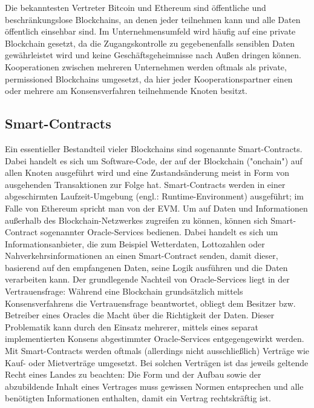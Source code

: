 Die bekanntesten Vertreter Bitcoin und Ethereum sind öffentliche und beschränkungslose Blockchains, an denen jeder teilnehmen kann und alle Daten öffentlich einsehbar sind. Im Unternehmensumfeld wird häufig auf eine private Blockchain gesetzt, da die Zugangskontrolle zu gegebenenfalls sensiblen Daten gewährleistet wird und keine Geschäftsgeheimnisse nach Außen dringen können. Kooperationen zwischen mehreren Unternehmen werden oftmals als private, permissioned Blockchains umgesetzt, da hier jeder Kooperationspartner einen oder mehrere am Konsensverfahren teilnehmende Knoten besitzt.


\subsection{Smart-Contracts}
\label{subsec:fundamentals:dlt:smartcontracts}
Ein essentieller Bestandteil vieler Blockchains sind sogenannte Smart-Contracts. Dabei handelt es sich um Software-Code, der auf der Blockchain ("onchain") auf allen Knoten ausgeführt wird und eine Zustandsänderung meist in Form von ausgehenden Transaktionen zur Folge hat. Smart-Contracts werden in einer abgeschirmten Laufzeit-Umgebung (engl.: Runtime-Environment) ausgeführt; im Falle von Ethereum spricht man von der \ac{EVM}. Um auf Daten und Informationen außerhalb des Blockchain-Netzwerkes zugreifen zu können, können sich Smart-Contract sogenannter Oracle-Services bedienen. Dabei handelt es sich um Informationsanbieter, die zum Beispiel Wetterdaten, Lottozahlen oder Nahverkehrsinformationen an einen Smart-Contract senden, damit dieser, basierend auf den empfangenen Daten, seine Logik ausführen und die Daten verarbeiten kann. Der grundlegende Nachteil von Oracle-Services liegt in der Vertrauensfrage: Während eine Blockchain grundsätzlich mittels Konsensverfahrens die Vertrauensfrage beantwortet, obliegt dem Besitzer bzw. Betreiber eines Oracles die Macht über die Richtigkeit der Daten. Dieser Problematik kann durch den Einsatz mehrerer, mittels eines separat implementierten Konsens abgestimmter Oracle-Services entgegengewirkt werden.\\
Mit Smart-Contracts werden oftmals (allerdings nicht ausschließlich) Verträge wie Kauf- oder Mietverträge umgesetzt. Bei solchen Verträgen ist das jeweils geltende Recht eines Landes zu beachten: Die Form und der Aufbau sowie der abzubildende Inhalt eines Vertrages muss gewissen Normen entsprechen und alle benötigten Informationen enthalten, damit ein Vertrag rechtskräftig ist.


